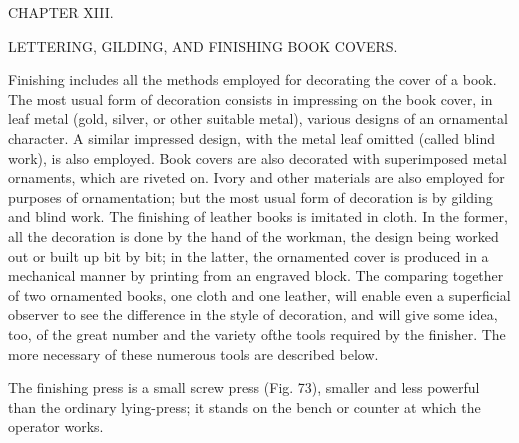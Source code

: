 \documentclass[twoside]{book}
\begin{document}
\vspace*{\fill}

\begin{center}

\begin{large}CHAPTER XIII.\end{large}

\begin{small}LETTERING, GILDING, AND FINISHING BOOK COVERS.\end{small}

\end{center}

\noindent
Finishing includes all the methods employed for
decorating the cover of a book. The most usual
form of decoration consists in impressing on the
book cover, in leaf metal (gold, silver, or other
suitable metal), various designs of an ornamental
character. A similar impressed design, with the
metal leaf omitted (called blind work), is also
employed. Book covers are also decorated with
superimposed metal ornaments, which are riveted on.
Ivory and other materials are also employed for
purposes of ornamentation; but the most usual
form of decoration is by gilding and blind work.
The finishing of leather books is imitated in cloth.
In the former, all the decoration is done by the hand
of the workman, the design being worked out or
built up bit by bit; in the latter, the ornamented
cover is produced in a mechanical manner by printing
from an engraved block. The comparing together of
two ornamented books, one cloth and one leather,
will enable even a superficial observer to see
the difference in the style of decoration, and
will give some idea, too, of the great number and
the variety ofthe tools required by the finisher. The
more necessary of these numerous tools are described below.

The finishing press is a small screw press
(Fig. 73), smaller and less powerful than the ordinary
lying-press; it stands on the bench or counter at
which the operator works.
\end{document}
